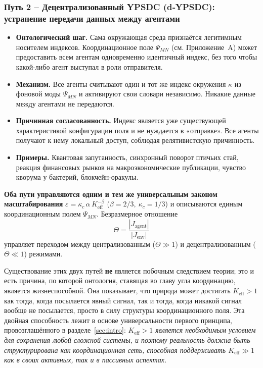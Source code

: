 \documentclass[11pt,a4paper]{article}
\begin{document}
	\subsubsection*{Путь 2 – Децентрализованный YPSDC (d‑YPSDC): устранение передачи данных между агентами}
	\begin{itemize}[leftmargin=*]
		\item \textbf{Онтологический шаг.} Сама окружающая среда признаётся
		легитимным носителем индексов. Координационное поле \(\Psi_{MN}\) (см.
		Приложение~A) может предоставить всем агентам одновременно идентичный индекс,
		без того чтобы какой-либо агент выступал в роли отправителя.
		\item \textbf{Механизм.} Все агенты считывают один и тот же индекс окружения
		\(\kappa\) из фоновой моды \(\Psi_{MN}\) и активируют свои
		словари независимо. Никакие данные между агентами не передаются.
		\item \textbf{Причинная согласованность.} Индекс является уже существующей характеристикой
		конфигурации поля и не нуждается в «отправке». Все агенты получают к нему
		локальный доступ, соблюдая релятивистскую причинность.
		\item \textbf{Примеры.} Квантовая запутанность, синхронный поворот
		птичьих стай, реакция финансовых рынков на макроэкономические публикации, чувство кворума
		у бактерий, блокчейн-оракулы.
	\end{itemize}
	
	\medskip
	\noindent
	\textbf{Оба пути управляются одним и тем же универсальным законом масштабирования}
	\(\varepsilon = \kappa_c\,\alpha\,K_{\mathrm{eff}}^{-\beta}\)
	(\(\beta = 2/3,\ \kappa_c = 1/3\)) и описываются единым
	координационным полем \(\Psi_{MN}\). Безразмерное отношение
	\[
	\Theta = \frac{|J_{\mathrm{agent}}|}{|J_{\mathrm{env}}|}
	\]
	управляет переходом между централизованным (\(\Theta \gg 1\)) и
	децентрализованным (\(\Theta \ll 1\)) режимами.
	
	Существование этих двух путей \textbf{не} является побочным следствием
	теории; это и есть причина, по которой онтология, ставящая во главу угла координацию,
	является жизнеспособной. Она показывает, что природа может достигать \(K_{\mathrm{eff}} > 1\) как тогда, когда
	посылается явный сигнал, так и тогда, когда никакой сигнал вообще не посылается, просто
	в силу структуры координационного поля. Эта двойная способность
	лежит в основе универсальности первого принципа, провозглашённого в
	разделе~\ref{sec:intro}: \emph{\(K_{\mathrm{eff}} > 1\) является необходимым
		условием для сохранения любой сложной системы, и поэтому реальность должна
		быть структурирована как координационная сеть, способная поддерживать
		\(K_{\mathrm{eff}} \gg 1\) как в своих активных, так и в пассивных аспектах.}
	
\end{document}
